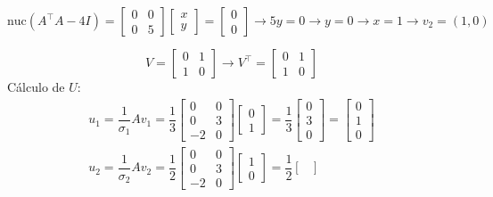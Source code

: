 \begin{enumerate}[label=\color{red}\textbf{\arabic*)}]
\begin{itemize}[label=\textbullet]
        $\mathrm{nuc}(A^\intercal A-4I)=\begin{bmatrix} 
            0 & 0\\
            0 & 5
        \end{bmatrix}\begin{bmatrix} 
        x\\y 
        \end{bmatrix}=\begin{bmatrix} 
        0\\0 
        \end{bmatrix}\longrightarrow 5y=0\longrightarrow y=0\longrightarrow x=1\longrightarrow v_2=(1,0)   $
\end{itemize}
\[
V=\begin{bmatrix} 
    0 & 1\\
    1 & 0
\end{bmatrix}\longrightarrow V^\intercal=\begin{bmatrix} 
    0 & 1\\
    1 & 0
\end{bmatrix}  
\] 
Cálculo de $U$:  \[
\begin{array}{l}
    u_1=\dfrac{1}{\sigma_1}Av_1=\dfrac{1}{3}\begin{bmatrix} 
        0 & 0\\
        0 & 3\\
        -2 & 0
    \end{bmatrix} \begin{bmatrix} 
    0\\1 
    \end{bmatrix} =\dfrac{1}{3}\begin{bmatrix} 
    0\\3\\0 
    \end{bmatrix} =\begin{bmatrix} 
    0\\1\\0 
    \end{bmatrix} \\
    u_2=\dfrac{1}{\sigma_2}Av_2=\dfrac{1}{2}\begin{bmatrix} 
        0 & 0\\0 & 3\\-2 & 0 
    \end{bmatrix} \begin{bmatrix} 
    1\\0 
    \end{bmatrix} =\dfrac{1}{2}\begin{bmatrix} 

\end{bmatrix}
\end{array}\]
\end{enumerate}
